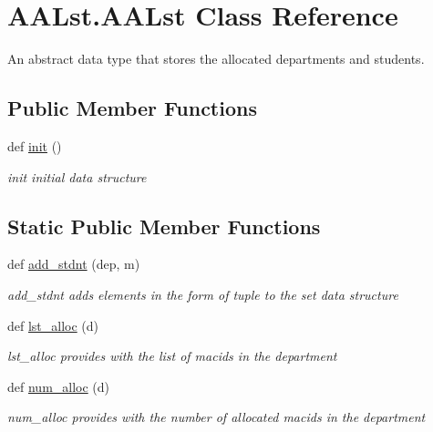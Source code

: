\hypertarget{class_a_a_lst_1_1_a_a_lst}{}\section{A\+A\+Lst.\+A\+A\+Lst Class Reference}
\label{class_a_a_lst_1_1_a_a_lst}


An abstract data type that stores the allocated departments and students.  


\subsection*{Public Member Functions}
\begin{DoxyCompactItemize}
\item 
\mbox{\label{class_a_a_lst_1_1_a_a_lst_ade2ae95f7a0e7ad568b8fdcccdc18556}} 
def \mbox{\hyperlink{class_a_a_lst_1_1_a_a_lst_ade2ae95f7a0e7ad568b8fdcccdc18556}{init}} ()
\begin{DoxyCompactList}\small\item\em init initial data structure \end{DoxyCompactList}\end{DoxyCompactItemize}
\subsection*{Static Public Member Functions}
\begin{DoxyCompactItemize}
\item 
def \mbox{\hyperlink{class_a_a_lst_1_1_a_a_lst_a6cc4b320d445656b347115c3d440be45}{add\+\_\+stdnt}} (dep, m)
\begin{DoxyCompactList}\small\item\em add\+\_\+stdnt adds elements in the form of tuple to the set data structure \end{DoxyCompactList}\item 
def \mbox{\hyperlink{class_a_a_lst_1_1_a_a_lst_aecd1653cb6c7db79cff37d34294a9fc2}{lst\+\_\+alloc}} (d)
\begin{DoxyCompactList}\small\item\em lst\+\_\+alloc provides with the list of macids in the department \end{DoxyCompactList}\item 
def \mbox{\hyperlink{class_a_a_lst_1_1_a_a_lst_a7751d151fd74a6ea51e662ab9f69284a}{num\+\_\+alloc}} (d)
\begin{DoxyCompactList}\small\item\em num\+\_\+alloc provides with the number of allocated macids in the department \end{DoxyCompactList}\end{DoxyCompactItemize}
